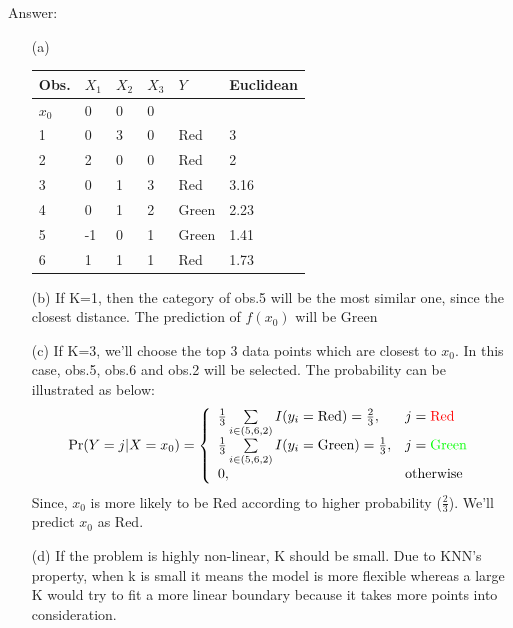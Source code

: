     \documentclass[12pt,fleqn,a4paper]{article}
\theoremstyle{definition}
\theoremstyle{plain}
\begin{document}
\begin{framed}
Answer:
    \begin{enumerate}
        \item[(a)]
            \begin{tabular}{llllll}
            Obs.  & $X_{1}$    & $X_{2}$     & $X_{3}$  & $Y$ & Euclidean\\
            \toprule
            $x_{0}$ & 0 & 0 & 0 & &  \\
            \toprule
            1 & 0 & 3 & 0 & Red & 3 \\
            2 & 2 & 0 & 0 & Red & 2 \\
            3 & 0 & 1 & 3 & Red & 3.16 \\
            4 & 0 & 1 & 2 & Green & 2.23 \\
            5 & -1 & 0 & 1 & Green & 1.41 \\
            6 & 1 & 1 & 1 & Red & 1.73 \\
            \bottomrule
            \end{tabular}
        \item[(b)] If K=1, then the category of obs.5 will be the most similar one, since the closest distance. The prediction of $\hat{f}(x_{0})$ will be Green

        \item[(c)] If K=3, we'll choose the top 3 data points which are closest to $x_{0}$. In this case, obs.5, obs.6 and obs.2 will be selected. The probability can be illustrated as below:
            \begin{gather}
            {\rm Pr}(Y=j|X=x_{0}) = \left\{
            \begin{array}{ll}
            \frac{1}{3}\sum\limits_{i \in (5,6,2)}I(y_{i}=\mbox{Red}) = \frac{2}{3}, & j = \mbox{\color{red}Red}\\
            \frac{1}{3}\sum\limits_{i \in (5,6,2)}I(y_{i}=\mbox{Green})= \frac{1}{3}, & j = \mbox{\color{green}Green}\\
            0, & \mbox{otherwise} \\
            \end{array} \right.
            \end{gather}
            Since, $x_{0}$ is more likely to be Red according to higher probability ($\frac{2}{3}$). We'll predict $x_{0}$ as Red.
        \item[(d)] If the problem is highly non-linear, K should be small. Due to KNN's property, when k is small it means the model is more flexible
                   whereas a large K would try to fit a more linear boundary because it takes more points into consideration.
    \end{enumerate}
\end{framed}
\end{document}
